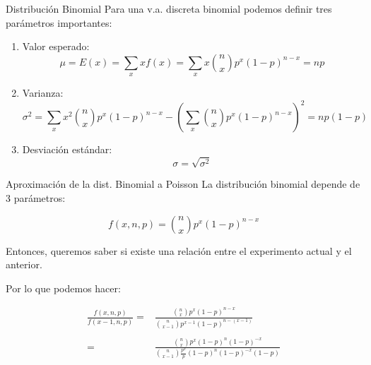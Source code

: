 \documentclass{beamer}
\begin{document}
\begin{frame}{Distribución Binomial}
  Para una v.a. discreta binomial podemos definir tres parámetros importantes:

  \begin{enumerate}
    \item Valor esperado:
    \begin{equation}
      \mu = E(x) = \sum_{x}^{} x f(x) = \sum_{x}^{} x \binom{n}{x} p^x (1-p)^{n-x} = np
    \end{equation}

    \item Varianza:
    \begin{equation}
      \sigma^2 = \sum_{x} x^2 \binom{n}{x} p^x (1-p)^{n-x} - (\sum_{x} \binom{n}{x} p^x (1-p)^{n-x})^2 = np(1-p)
    \end{equation}

    \item Desviación estándar:
    \begin{equation}
      \sigma = \sqrt{\sigma^2}
    \end{equation}

  \end{enumerate}

\end{frame}


\begin{frame}{Aproximación de la dist. Binomial a Poisson}
  La distribución binomial depende de 3 parámetros:

  \begin{equation}
    f(x,n,p) = \binom{n}{x} p^x (1-p)^{n-x}
  \end{equation}

Entonces, queremos saber si existe una relación entre el experimento actual y el
anterior.

Por lo que podemos hacer:

\begin{equation}
  \begin{array}{rr}
  \frac{f(x,n,p)}{f(x-1,n,p)} = & \frac{\binom{n}{x} p^x (1-p)^{n-x}}{\binom{n}{x-1} p^{x-1} (1-p)^{n-(x-1)}} \\
  \\

                              = & \frac{\binom{n}{x} p^x (1-p)^{n} (1-p)^{-x}}{\binom{n}{x-1} \frac{p^x}{p} (1-p)^{n}(1-p)^{-x} (1-p)}
  \end{array}
\end{equation}

\end{frame}
\end{document}
